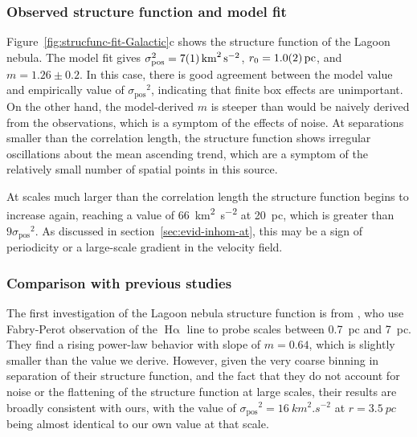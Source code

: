 \documentclass[fleqn,usenatbib, useAMS, a4paper]{mnras}
\newcommand\pos{\ensuremath{_{\mathrm{pos}}}}
\newcommand\ha{\ensuremath{\text{H}\upalpha}}
\begin{document}
\subsubsection{Observed structure function and model fit}
\label{sec:observ-struct-funct-lagoon}

Figure~\ref{fig:strucfunc-fit-Galactic}c shows the structure function of the Lagoon nebula.
The model fit gives \(\sigma\pos^2 = \SI{7 \pm 1}{km^{2}.s^{-2}}\), \(r_0 = \SI{1 \pm 0.2}{pc} \), and \(m = 1.26 \pm 0.2\).
In this case, there is good agreement between the model value and empirically value of \(\sigma\pos^2\),
indicating that finite box effects are unimportant.
On the other hand, the model-derived \(m\) is steeper than would be naively derived
from the observations, which is a symptom of the effects  of noise.
At separations smaller than the correlation length, the structure function shows irregular oscillations about the mean ascending trend,
which are a symptom of the relatively small number of spatial points in this source.

At scales much larger than the correlation length
the structure function begins to increase again, reaching a value of \SI{66}{km^{2}.s^{-2}} at \SI{20}{pc},
which is greater than \(9 \sigma\pos^2\).
As discussed in section~\ref{sec:evid-inhom-at}, this may be a sign of periodicity
or a large-scale gradient in the velocity field.


\subsubsection{Comparison with previous studies}
\label{sec:comparison-lagoon}
The first investigation of the Lagoon nebula structure function is from \citet{1970A&A.....8..486L},
who use Fabry-Perot observation of the \ha{} line to probe scales
between \SI{0.7}{pc} and \SI{7}{pc}.
They find a rising power-law behavior with slope of \(m = 0.64\),
which is slightly smaller than the value we derive.
However, given the very coarse binning in separation of their structure function,
and the fact that they do not account for noise or the flattening of the structure function at large scales,
their results are broadly consistent with ours,
with the value of \( \sigma\pos^2 = \SI{16}{km^{2}.s^{-2}}\) at \(r = \SI{3.5}{pc}\) being almost
identical to our own value at that scale.
\end{document}
